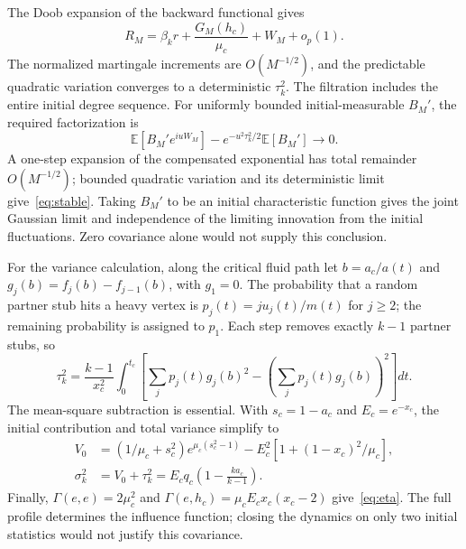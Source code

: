 \documentclass[11pt,a4paper]{article}
\newcommand{\E}{\mathbb E}
\begin{document}
The Doob expansion of the backward functional gives
\begin{equation}
R_M=\beta_k r+\frac{G_M(h_c)}{\mu_c}+W_M+o_p(1).\label{eq:decomp}
\end{equation}
The normalized martingale increments are $O(M^{-1/2})$, and the predictable quadratic variation converges to a deterministic $\tau_k^2$. The filtration includes the entire initial degree sequence. For uniformly bounded initial-measurable $B_M'$, the required factorization is
\begin{equation}
\E[B_M'e^{iuW_M}]-e^{-u^2\tau_k^2/2}\E[B_M']\longrightarrow0.\label{eq:stable}
\end{equation}
A one-step expansion of the compensated exponential has total remainder $O(M^{-1/2})$; bounded quadratic variation and its deterministic limit give~\eqref{eq:stable}. Taking $B_M'$ to be an initial characteristic function gives the joint Gaussian limit and independence of the limiting innovation from the initial fluctuations. Zero covariance alone would not supply this conclusion.

For the variance calculation, along the critical fluid path let $b=a_c/a(t)$ and $g_j(b)=f_j(b)-f_{j-1}(b)$, with $g_1=0$. The probability that a random partner stub hits a heavy vertex is $p_j(t)=ju_j(t)/m(t)$ for $j\ge2$; the remaining probability is assigned to $p_1$. Each step removes exactly $k-1$ partner stubs, so
\begin{equation}
\tau_k^2=\frac{k-1}{x_c^2}\int_0^{t_c}
\left[\sum_jp_j(t)g_j(b)^2-\left(\sum_jp_j(t)g_j(b)\right)^2\right]dt.\label{eq:tau}
\end{equation}
The mean-square subtraction is essential. With $s_c=1-a_c$ and $E_c=e^{-x_c}$, the initial contribution and total variance simplify to
\begin{align}
V_0&=(1/\mu_c+s_c^2)e^{\mu_c(s_c^2-1)}
-E_c^2[1+(1-x_c)^2/\mu_c],\\
\sigma_k^2&=V_0+\tau_k^2=E_cq_c\left(1-\frac{k a_c}{k-1}\right).
\end{align}
Finally, $\Gamma(e,e)=2\mu_c^2$ and
$\Gamma(e,h_c)=\mu_cE_cx_c(x_c-2)$ give~\eqref{eq:eta}. The full profile determines the influence function; closing the dynamics on only two initial statistics would not justify this covariance.
\end{document}
